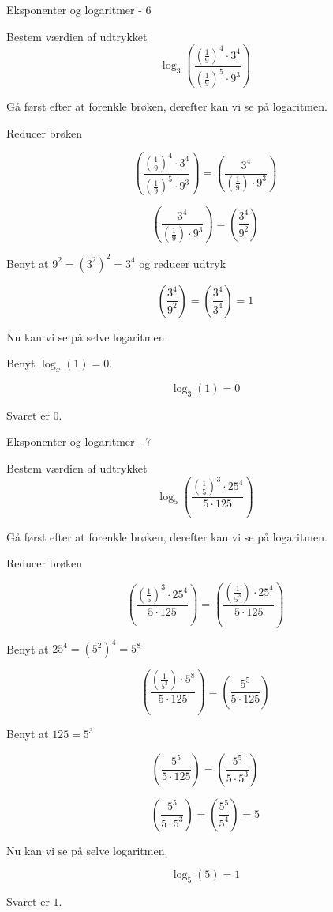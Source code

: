 \documentclass{article}
\begin{document}
\newpage
\begin{exercise}{Eksponenter og logaritmer - 6}
	
	Bestem værdien af udtrykket
	\[
	\log_3\left(\frac{\left(\frac{1}{9}\right)^4 \cdot 3^4}{\left(\frac{1}{9}\right)^5 \cdot 9^3} \right)
	\]
	
	
	\hint
	Gå først efter at forenkle brøken, derefter kan vi se på logaritmen.
	
	\hint
	Reducer brøken 
	
	\hint
	\[
	\left(\frac{\left(\frac{1}{9}\right)^4 \cdot 3^4}{\left(\frac{1}{9}\right)^5 \cdot 9^3} \right) = 
	\left(\frac{3^4}{\left(\frac{1}{9}\right) \cdot 9^3} \right)
	\]
	
	\hint
	\[
	\left(\frac{3^4}{\left(\frac{1}{9}\right) \cdot 9^3} \right) = 
	\left(\frac{3^4}{9^2} \right)
	\]
	
	
	\hint
	Benyt at $9^2=(3^2)^2 = 3^4$ og reducer udtryk
	
	\hint
	\[
	\left(\frac{3^4}{9^2} \right) = 
	\left(\frac{3^4}{3^4} \right) = 1
	\]

	
	\hint
	Nu kan vi se på selve logaritmen.
	
	\hint
	Benyt $\log_x (1) = 0$.
	
	\hint
	\[
	\log_3\left(1 \right) = 0
	\]
	
	
	\hint
	Svaret er $0$.
	
\end{exercise}

\newpage
\begin{exercise}{Eksponenter og logaritmer - 7}
	
	Bestem værdien af udtrykket
	\[
	\log_5\left(\frac{\left(\frac{1}{5}\right)^3 \cdot 25^4}{5 \cdot 125} \right)
	\]
	
	
	\hint
	Gå først efter at forenkle brøken, derefter kan vi se på logaritmen.
	
	\hint
	Reducer brøken 
	
	\hint
	\[
	\left(\frac{\left(\frac{1}{5}\right)^3 \cdot 25^4}{5 \cdot 125} \right) = 
	\left(\frac{\left(\frac{1}{5^3}\right) \cdot 25^4}{5 \cdot 125} \right)
	\]
	
	\hint
	Benyt at $25^4 = (5^2)^4 = 5^8$
	
	\hint
	\[
	\left(\frac{\left(\frac{1}{5^3}\right) \cdot 5^8}{5 \cdot 125} \right) = 
	\left(\frac{5^5}{5 \cdot 125} \right)
	\]
	
	\hint
	Benyt at $125 = 5^3$
	
	\hint
	\[
	\left(\frac{5^5}{5 \cdot 125} \right) = \left(\frac{5^5}{5 \cdot 5^3} \right)
	\]
	
	\hint
	\[
	\left(\frac{5^5}{5 \cdot 5^3} \right) = \left(\frac{5^5}{5^4} \right) = 5
	\]
	
	
	\hint
	Nu kan vi se på selve logaritmen.
	
	\hint
	\[
	\log_5\left(5\right) = 1
	\]
	
	
	\hint
	Svaret er $1$.
	
\end{exercise}
\end{document}

